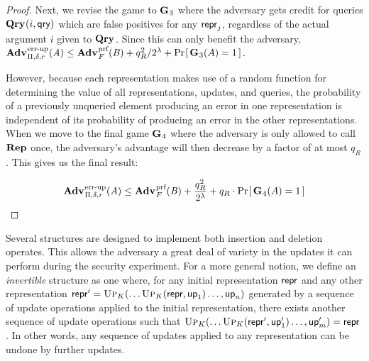 {{\begin{proof}
Next, we revise the game to $\textup{\textbf{G}}\hspace{0.5pt}_3$ where the adversary gets credit for
queries $\textup{\textbf{Qry}}\hspace{0.5pt}(i,\mathsf{qry})$ which are false positives for any $\mathsf{repr}_j$, regardless
of the actual argument $i$ given to $\textup{\textbf{Qry}}\hspace{0.5pt}$. Since this can only benefit the
adversary, $\Adv{\errep}_{\struct,\delta,r}(\advA) \le \Adv{\prf}_F(\advB) +
q_R^2/2^\lambda + \Prob{\game_3(A) = 1}$.

However, because each representation makes use of a random function for
determining the value of all representations, updates, and queries, the
probability of a previously unqueried element producing an error in one
representation is independent of its probability of producing an error in the
other representations. When we move to the final game $\textup{\textbf{G}}\hspace{0.5pt}_4$ where the
adversary is only allowed to call $\textup{\textbf{Rep}}\hspace{0.5pt}$ once, the adversary's advantage will
then decrease by a factor of at most $q_R$. This gives us the final result:

$$\Adv{\errep}_{\struct,\delta,r}(\advA) \le \Adv{\prf}_F(\advB) +
\frac{q_R^2}{2^\lambda} + q_R \cdot \Prob{\game_4(A) = 1}$$\missingqed
{}
\end{proof}
}

%
Several structures are designed to implement both insertion and deletion
operates. This allows the adversary a great deal of variety in the updates it
can perform during the security experiment. For a more general notion, we define
an \textit{invertible} structure  as one
where, for any initial representation $\mathsf{repr}$ and any other representation $\mathsf{repr}'
= \textnormal{\textsc{Up}}_K(\ldots\textnormal{\textsc{Up}}_K(\mathsf{repr},\mathsf{up}_1)\ldots,\mathsf{up}_n)$ generated by a sequence of update
operations applied to the initial representation, there exists another sequence
of update operations such that $\textnormal{\textsc{Up}}_K(\ldots\textnormal{\textsc{Up}}_K(\mathsf{repr}',\mathsf{up}'_1)\ldots,\mathsf{up}'_m) =
\mathsf{repr}$. In other words, any sequence of updates applied to any representation can
be undone by further updates.

}
